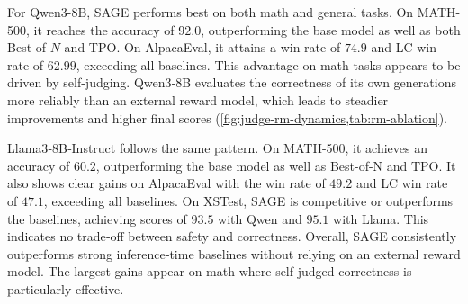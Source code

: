 \documentclass{article}
\theoremstyle{plain}
\theoremstyle{definition}
\theoremstyle{remark}
\newcommand{\method}{SAGE} %
\begin{document}
For Qwen3-8B, \method{} performs best on both math and general tasks. On MATH-500, it reaches the accuracy of \(92.0\), outperforming the base model as well as both Best-of-\(N\) and TPO. On AlpacaEval, it attains a win rate of \(74.9\) and LC win rate of \(62.99\), exceeding all baselines.  This advantage on math tasks appears to be driven by self-judging. Qwen3‑8B evaluates the correctness of its own generations more reliably than an external reward model, which leads to steadier improvements and higher final scores (\cref{fig:judge-rm-dynamics,tab:rm-ablation}).

Llama3‑8B‑Instruct follows the same pattern. On MATH-500, it achieves an accuracy of \(60.2\), outperforming the base model as well as Best-of-N and TPO. It also shows clear gains on AlpacaEval with the win rate of \(49.2\) and LC win rate of \(47.1\), exceeding all baselines. On XSTest, \method{} is competitive or outperforms the baselines, achieving scores of \(93.5\) with Qwen and \(95.1\) with Llama. This indicates no trade‑off between safety and correctness. Overall, \method{} consistently outperforms strong inference‑time baselines without relying on an external reward model. The largest gains appear on math where self‑judged correctness is particularly effective.
\end{document}
